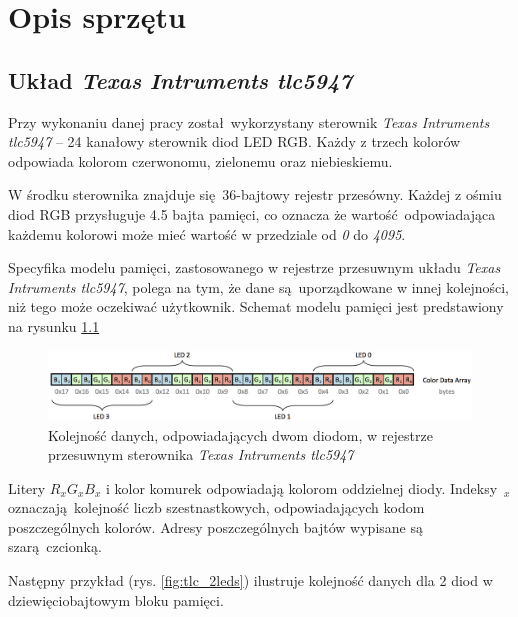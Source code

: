 \documentclass[eng,printmode]{mgr}
\begin{document}
\chapter{Opis sprzętu}

\section{Układ \emph{Texas Intruments tlc5947}}
Przy wykonaniu danej pracy został wykorzystany sterownik \emph{Texas Intruments tlc5947} -- 24 kanałowy sterownik diod LED RGB. Każdy z trzech kolorów odpowiada kolorom czerwonomu, zielonemu oraz niebieskiemu.

W środku sterownika znajduje się 36-bajtowy rejestr przesówny. Każdej z ośmiu diod RGB przysługuje 4.5 bajta pamięci, co oznacza że wartość odpowiadająca każdemu kolorowi może mieć wartość w przedziale od \emph{0} do \emph{4095}. 

Specyfika modelu pamięci, zastosowanego w rejestrze przesuwnym układu \emph{Texas Intruments tlc5947}, polega na tym, że dane są uporządkowane w innej kolejności, niż tego może oczekiwać użytkownik. Schemat modelu pamięci jest predstawiony na rysunku \ref{fig:tlc_array}

\begin{figure}[!ht]
    \centering
    \includegraphics[width=\textwidth]{Figures/tlc_array.png} 
    \caption{Kolejność danych, odpowiadających dwom diodom, w rejestrze przesuwnym sterownika \emph{Texas Intruments tlc5947}}
    \label{fig:tlc_array}
\end{figure}

Litery $R_x G_x B_x$ i kolor komurek odpowiadają kolorom oddzielnej diody. Indeksy~$_x$ oznaczają kolejność liczb szestnastkowych, odpowiadających kodom poszczególnych kolorów. Adresy poszczególnych bajtów wypisane są szarą czcionką. 

Następny przykład (rys. \ref{fig:tlc_2leds}) ilustruje kolejność danych dla 2 diod w dziewięciobajtowym bloku pamięci.
\end{document}
